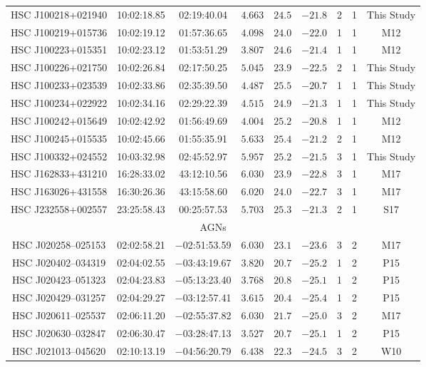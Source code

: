 \documentclass[]{pasj01}
\begin{document}
{\begin{longtable}{ccccccccc}
HSC J100218+021940 & 10:02:18.85 & 02:19:40.04 & $4.663$ & $24.5$ & $-21.8$ & 2 & 1 & This Study \\
HSC J100219+015736 & 10:02:19.12 & 01:57:36.65 & $4.098$ & $24.0$ & $-22.0$ & 1 & 1 & M12 \\
HSC J100223+015351 & 10:02:23.12 & 01:53:51.29 & $3.807$ & $24.6$ & $-21.4$ & 1 & 1 & M12 \\
HSC J100226+021750 & 10:02:26.84 & 02:17:50.25 & $5.045$ & $23.9$ & $-22.5$ & 2 & 1 & This Study \\
HSC J100233+023539 & 10:02:33.86 & 02:35:39.50 & $4.487$ & $25.5$ & $-20.7$ & 1 & 1 & This Study \\
HSC J100234+022922 & 10:02:34.16 & 02:29:22.39 & $4.515$ & $24.9$ & $-21.3$ & 1 & 1 & This Study \\
HSC J100242+015649 & 10:02:42.92 & 01:56:49.69 & $4.004$ & $25.2$ & $-20.8$ & 1 & 1 & M12 \\
HSC J100245+015535 & 10:02:45.66 & 01:55:35.91 & $5.633$ & $25.4$ & $-21.2$ & 2 & 1 & M12 \\
HSC J100332+024552 &  10:03:32.98  &  02:45:52.97   & $5.957$ & $25.2$ & $-21.5$ & 3 & 1 & This Study \\
HSC J162833+431210 & 16:28:33.02 & 43:12:10.56 & $6.030$ & $23.9$ & $-22.8$ & 3 & 1 & M17 \\
HSC J163026+431558 & 16:30:26.36 & 43:15:58.60 & $6.020$ & $24.0$ & $-22.7$ & 3 & 1 & M17 \\
HSC J232558+002557 & 23:25:58.43 & 00:25:57.53 & $5.703$ & $25.3$ & $-21.3$ & 2 & 1 & S17 \\
\hline
    \multicolumn{9}{c}{AGNs} \\
HSC J020258--025153 & 02:02:58.21 & $-$02:51:53.59 & $6.030$ & $23.1$ & $-23.6$ & 3 & 2 & M17 \\
HSC J020402--034319 & 02:04:02.55 & $-$03:43:19.67 & $3.820$ & $20.7$ & $-25.2$ & 1 & 2 & P15 \\
HSC J020423--051323 & 02:04:23.83 & $-$05:13:23.40 & $3.768$ & $20.8$ & $-25.1$ & 1 & 2 & P15 \\
HSC J020429--031257 & 02:04:29.27 & $-$03:12:57.41 & $3.615$ & $20.4$ & $-25.4$ & 1 & 2 & P15 \\
HSC J020611--025537 & 02:06:11.20 & $-$02:55:37.82 & $6.030$ & $21.7$ & $-25.0$ & 3 & 2 & M17 \\
HSC J020630--032847 & 02:06:30.47 & $-$03:28:47.13 & $3.527$ & $20.7$ & $-25.1$ & 1 & 2 & P15 \\
HSC J021013--045620 & 02:10:13.19 & $-$04:56:20.79 & $6.438$ & $22.3$ & $-24.5$ & 3 & 2 & W10 \\

\end{longtable}}
\end{document}
